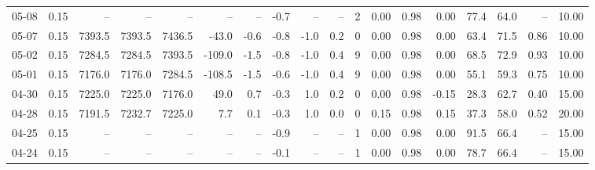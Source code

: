 \begin{threeparttable}
{\begin{tabular}{lrrrrrrrrrrrrrrrrr}
  05-08 &     0.15 &     -- &     -- &     -- &         -- &             -- &                      -0.7 &                       -- &                  -- &              2 &       0.00 &      0.98 &           0.00 &             77.4 &                64.0 &              -- &                  10.00 \\
  05-07 &     0.15 & 7393.5 & 7393.5 & 7436.5 &      -43.0 &           -0.6 &                      -0.8 &                     -1.0 &                 0.2 &              0 &       0.00 &      0.98 &           0.00 &             63.4 &                71.5 &            0.86 &                  10.00 \\
  05-02 &     0.15 & 7284.5 & 7284.5 & 7393.5 &     -109.0 &           -1.5 &                      -0.8 &                     -1.0 &                 0.4 &              9 &       0.00 &      0.98 &           0.00 &             68.5 &                72.9 &            0.93 &                  10.00 \\
  05-01 &     0.15 & 7176.0 & 7176.0 & 7284.5 &     -108.5 &           -1.5 &                      -0.6 &                     -1.0 &                 0.4 &              9 &       0.00 &      0.98 &           0.00 &             55.1 &                59.3 &            0.75 &                  10.00 \\
  04-30 &     0.15 & 7225.0 & 7225.0 & 7176.0 &       49.0 &            0.7 &                      -0.3 &                      1.0 &                 0.2 &              0 &       0.00 &      0.98 &          -0.15 &             28.3 &                62.7 &            0.40 &                  15.00 \\
  04-28 &     0.15 & 7191.5 & 7232.7 & 7225.0 &        7.7 &            0.1 &                      -0.3 &                      1.0 &                 0.0 &              0 &       0.15 &      0.98 &           0.15 &             37.3 &                58.0 &            0.52 &                  20.00 \\
  04-25 &     0.15 &     -- &     -- &     -- &         -- &             -- &                      -0.9 &                       -- &                  -- &              1 &       0.00 &      0.98 &           0.00 &             91.5 &                66.4 &              -- &                  15.00 \\
  04-24 &     0.15 &     -- &     -- &     -- &         -- &             -- &                      -0.1 &                       -- &                  -- &              1 &       0.00 &      0.98 &           0.00 &             78.7 &                66.4 &              -- &                  15.00 \\

\end{tabular}}
\end{threeparttable}
